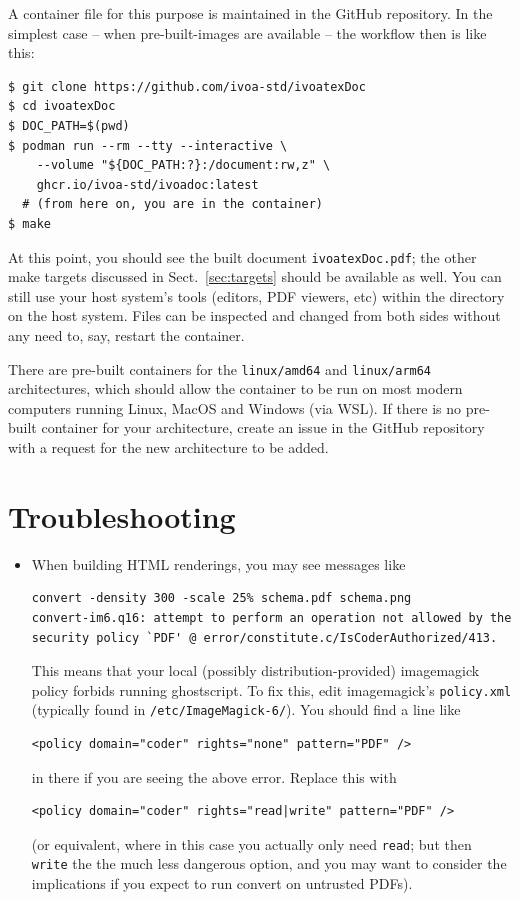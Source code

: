 \documentclass[11pt,a4paper]{ivoa}
\begin{document}
A container file for this purpose is maintained in the \ivoatex GitHub repository.
In the simplest case -- when pre-built-images are available -- the workflow then is like this:

\begin{lstlisting}
$ git clone https://github.com/ivoa-std/ivoatexDoc
$ cd ivoatexDoc
$ DOC_PATH=$(pwd)
$ podman run --rm --tty --interactive \
    --volume "${DOC_PATH:?}:/document:rw,z" \
    ghcr.io/ivoa-std/ivoadoc:latest
  # (from here on, you are in the container)
$ make
\end{lstlisting}

At this point, you should see the built document \verb|ivoatexDoc.pdf|;
the other make targets discussed in Sect.~\ref{sec:targets} should be
available as well.  You can still use your host system's tools (editors,
PDF viewers, etc) within the directory on the host system.  Files can be
inspected and changed from both sides without any need to, say, restart
the container.

There are pre-built containers for the \verb|linux/amd64| and \verb|linux/arm64| architectures,
which should allow the container to be run on most modern computers running Linux, MacOS and Windows (via WSL).
If there is no pre-built container for your architecture, create an issue in the \ivoatex GitHub repository
with a request for the new architecture to be added.


\section{Troubleshooting}

\begin{itemize}
\item When building HTML renderings, you may see messages like
\begin{lstlisting}
convert -density 300 -scale 25% schema.pdf schema.png
convert-im6.q16: attempt to perform an operation not allowed by the
security policy `PDF' @ error/constitute.c/IsCoderAuthorized/413.
\end{lstlisting}

This means that your local (possibly distribution-provided) imagemagick
policy forbids running ghostscript.  To fix this, edit imagemagick's
\verb|policy.xml| (typically found in \verb|/etc/ImageMagick-6/|).  You
should find a line like

\begin{lstlisting}
<policy domain="coder" rights="none" pattern="PDF" />
\end{lstlisting}

in there if you are seeing the above error.  Replace this with

\begin{lstlisting}
<policy domain="coder" rights="read|write" pattern="PDF" />
\end{lstlisting}

(or equivalent, where in this case you actually only need \verb|read|;
but then \verb|write| the the much less dangerous option, and you may
want to consider the implications if you expect to run convert on
untrusted PDFs).

\end{itemize}
\end{document}
